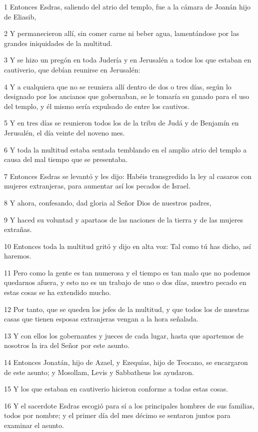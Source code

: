 \par 1 Entonces Esdras, saliendo del atrio del templo, fue a la cámara de Joanán hijo de Eliasib,
\par 2 Y permanecieron allí, sin comer carne ni beber agua, lamentándose por las grandes iniquidades de la multitud.
\par 3 Y se hizo un pregón en toda Judería y en Jerusalén a todos los que estaban en cautiverio, que debían reunirse en Jerusalén:
\par 4 Y a cualquiera que no se reuniera allí dentro de dos o tres días, según lo designado por los ancianos que gobernaban, se le tomaría su ganado para el uso del templo, y él mismo sería expulsado de entre los cautivos.
\par 5 Y en tres días se reunieron todos los de la tribu de Judá y de Benjamín en Jerusalén, el día veinte del noveno mes.
\par 6 Y toda la multitud estaba sentada temblando en el amplio atrio del templo a causa del mal tiempo que se presentaba.
\par 7 Entonces Esdras se levantó y les dijo: Habéis transgredido la ley al casaros con mujeres extranjeras, para aumentar así los pecados de Israel.
\par 8 Y ahora, confesando, dad gloria al Señor Dios de nuestros padres,
\par 9 Y haced su voluntad y apartaos de las naciones de la tierra y de las mujeres extrañas.
\par 10 Entonces toda la multitud gritó y dijo en alta voz: Tal como tú has dicho, así haremos.
\par 11 Pero como la gente es tan numerosa y el tiempo es tan malo que no podemos quedarnos afuera, y esto no es un trabajo de uno o dos días, nuestro pecado en estas cosas se ha extendido mucho.
\par 12 Por tanto, que se queden los jefes de la multitud, y que todos los de nuestras casas que tienen esposas extranjeras vengan a la hora señalada.
\par 13 Y con ellos los gobernantes y jueces de cada lugar, hasta que apartemos de nosotros la ira del Señor por este asunto.
\par 14 Entonces Jonatán, hijo de Azael, y Ezequías, hijo de Teocano, se encargaron de este asunto; y Mosollam, Levis y Sabbatheus los ayudaron.
\par 15 Y los que estaban en cautiverio hicieron conforme a todas estas cosas.
\par 16 Y el sacerdote Esdras escogió para sí a los principales hombres de sus familias, todos por nombre; y el primer día del mes décimo se sentaron juntos para examinar el asunto.
